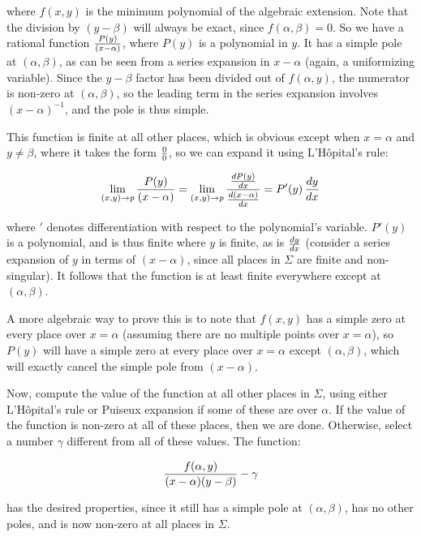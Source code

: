where $f(x,y)$ is the minimum polynomial of the algebraic extension.
Note that the division by $(y-\beta)$ will always be exact, since
$f(\alpha, \beta)=0$.  So we have a rational function
$P(y)\over(x-\alpha)$, where $P(y)$ is a polynomial in $y$.  It has a
simple pole at $(\alpha, \beta)$, as can be seen from a series
expansion in $x-\alpha$ (again, a uniformizing variable).  Since the
$y-\beta$ factor has been divided out of $f(\alpha,y)$, the numerator
is non-zero at $(\alpha, \beta)$, so the leading term in the series
expansion involves $(x-\alpha)^{-1}$, and the pole is thus simple.

This function is finite at all other places, which is obvious except
when $x=\alpha$ and $y\ne\beta$, where it takes the form $0\over0$,
so we can expand it using L'H\^opital's rule:

$$\lim_{(x,y)\to p} {{P(y)}\over(x-\alpha)}
  = \lim_{{(x,y)\to p}} {{{dP(y)}\over{dx}}\over{{d(x-\alpha)}\over{dx}}}
  = P'(y) \, {{dy}\over{dx}} $$

where $'$ denotes differentiation with respect to the polynomial's
variable.  $P'(y)$ is a polynomial, and is thus finite where $y$ is
finite, as is ${dy}\over{dx}$ (consider a series expansion of $y$ in
terms of $(x-\alpha)$, since all places in $\Sigma$ are finite and
non-singular).  It follows that the function is at least finite
everywhere except at $(\alpha, \beta)$.

A more algebraic way to prove this is to note that
$f(x,y)$ has a simple zero at every place over $x=\alpha$ (assuming
there are no multiple points over $x=\alpha$), so $P(y)$ will have a
simple zero at every place over $x=\alpha$ except $(\alpha, \beta)$,
which will exactly cancel the simple pole from $(x-\alpha)$.

Now, compute the value of the function at all other places in
$\Sigma$, using either L'H\^opital's rule or Puiseux expansion if some
of these are over $\alpha$.  If the value of the function is non-zero
at all of these places, then we are done.  Otherwise, select a number
$\gamma$ different from all of these values.  The function:

$${f(\alpha,y)\over(x-\alpha)(y-\beta)} - \gamma$$

has the desired properties, since it still has a simple pole at
$(\alpha,\beta)$, has no other poles, and is now non-zero at all
places in $\Sigma$.

